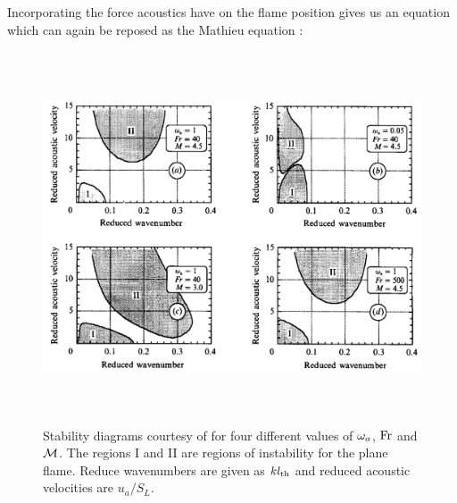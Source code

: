 Incorporating the force acoustics have on the flame position gives us an equation which can again be reposed as the Mathieu equation \cite{searby1991ParametricAcousticInstability}:


\begin{figure}[t]
\centering
\includegraphics[height=11cm]{assets/graphs/thermoacoustic-stability.png}
\caption{Stability diagrams courtesy of \cite{searby1991ParametricAcousticInstability} for four different values of $\w_a$, $\Fr$ and $\Mk$. The regions I and II are regions of instability for the plane flame. Reduce wavenumbers are given as $k l_\rm{th}$ and reduced acoustic velocities are $u_a / S_L$.}
\label{fig:ta-stab}
\end{figure}

